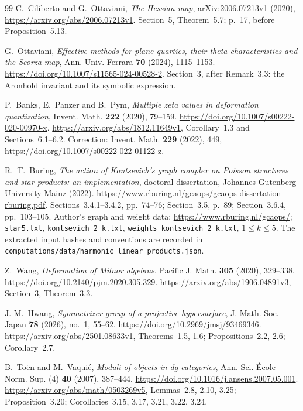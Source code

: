 \begin{thebibliography}{99}
C.~Ciliberto and G.~Ottaviani,
\emph{The Hessian map}, arXiv:2006.07213v1 (2020),
\url{https://arxiv.org/abs/2006.07213v1}.
Section~5, Theorem~5.7; p.~17, before Proposition~5.13.

G.~Ottaviani,
\emph{Effective methods for plane quartics, their theta characteristics and the Scorza map},
Ann. Univ. Ferrara \textbf{70} (2024), 1115--1153.
\url{https://doi.org/10.1007/s11565-024-00528-2}.
Section~3, after Remark~3.3: the Aronhold invariant and its symbolic expression.

P.~Banks, E.~Panzer and B.~Pym,
\emph{Multiple zeta values in deformation quantization},
Invent. Math. \textbf{222} (2020), 79--159.
\url{https://doi.org/10.1007/s00222-020-00970-x}.
\url{https://arxiv.org/abs/1812.11649v1},
Corollary~1.3 and Sections~6.1--6.2.
Correction: Invent. Math. \textbf{229} (2022), 449,
\url{https://doi.org/10.1007/s00222-022-01122-z}.

R.~T.~Buring,
\emph{The action of Kontsevich's graph complex on Poisson structures
and star products: an implementation},
doctoral dissertation, Johannes Gutenberg University Mainz (2022).
\url{https://www.rburing.nl/gcaops/gcaops-dissertation-rburing.pdf}.
Sections~3.4.1--3.4.2, pp.~74--76; Section~3.5, p.~89;
Section~3.6.4, pp.~103--105.
Author's graph and weight data:
\url{https://www.rburing.nl/gcaops/};
\texttt{star5.txt}, \texttt{kontsevich\_2\_k.txt},
\texttt{weights\_kontsevich\_2\_k.txt}, $1\le k\le5$.
The extracted input hashes and conventions are recorded in
\texttt{computations/data/harmonic\_linear\_products.json}.

Z.~Wang,
\emph{Deformation of Milnor algebras},
Pacific J. Math. \textbf{305} (2020), 329--338.
\url{https://doi.org/10.2140/pjm.2020.305.329}.
\url{https://arxiv.org/abs/1906.04891v3}, Section~3, Theorem~3.3.

J.-M.~Hwang,
\emph{Symmetrizer group of a projective hypersurface},
J. Math. Soc. Japan \textbf{78} (2026), no.~1, 55--62.
\url{https://doi.org/10.2969/jmsj/93469346}.
\url{https://arxiv.org/abs/2501.08633v1},
Theorems~1.5, 1.6; Propositions~2.2, 2.6; Corollary~2.7.

B.~To\"en and M.~Vaqui\'e,
\emph{Moduli of objects in dg-categories},
Ann. Sci. \'Ecole Norm. Sup. (4) \textbf{40} (2007), 387--444.
\url{https://doi.org/10.1016/j.ansens.2007.05.001}.
\url{https://arxiv.org/abs/math/0503269v5},
Lemmas~2.8, 2.10, 3.25; Proposition~3.20;
Corollaries~3.15, 3.17, 3.21, 3.22, 3.24.


\end{thebibliography}
